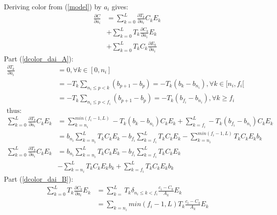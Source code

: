 \documentclass{article}
\begin{document}
\begin{appendices}
    Deriving color from (\ref{model}) by $a_i$ gives:
    \begin{align}
        \frac{\partial C}{\partial a_i} & = \sum_{k=0}^{L} \frac{\partial T_k}{\partial a_i} C_k E_k \label{dcolor_dai_A} \\
                                        & + \sum_{k=0}^{L} T_k \frac{\partial C_k}{\partial a_i} E_k \label{dcolor_dai_B} \\
                                        & + \sum_{k=0}^{L} T_k C_k \frac{\partial E_k}{\partial a_i} \label{dcolor_dai_C}
    \end{align}
    Part (\ref{dcolor_dai_A}):
    \begin{align}
        \frac{\partial T_k}{\partial a_i} & = 0, \forall k \in [0,n_i] \nonumber \\
                                          & = -T_k \sum_{n_i \leq p < k} (b_{p+1} - b_p) = -T_k (b_k - b_{n_i}), \forall k \in [n_i, f_i[ \nonumber \\
                                          & = -T_k \sum_{n_i \leq p < f_i}(b_{p+1} - b_p) = -T_k (b_{f_i} - b_{n_i}), \forall k \geq f_i \nonumber \\
        \text{thus:} \nonumber \\
        \sum_{k=0}^{L} \frac{\partial T_k}{\partial a_i} C_k E_k & = \sum_{k=n_i}^{min(f_i-1,L)} -T_k (b_k - b_{n_i}) C_k E_k + \sum_{k=f_i}^{L} -T_k (b_{f_i} - b_{n_i}) C_k E_k \nonumber \\
                                                                 & = b_{n_i} \sum_{k=n_i}^{L} T_k C_k E_k - b_{f_i} \sum_{k = f_i}^{L} T_k C_k E_k - \sum_{k=n_i}^{min(f_i-1,L)} T_k C_k E_k b_k \nonumber \\
        \sum_{k=0}^{L} \frac{\partial T_k}{\partial a_i} C_k E_k & = b_{n_i} \sum_{k=n_i}^{L} T_k C_k E_k - b_{f_i} \sum_{k = f_i}^{L} T_k C_k E_k \nonumber \\
                                                                 & - \sum_{k=n_i}^{L} T_k C_k E_k b_k + \sum_{k=f_i}^{L} T_k C_k E_k b_k \nonumber
    \end{align}
    Part (\ref{dcolor_dai_B}):
    \begin{align}
        \sum_{k=0}^{L} T_k \frac{\partial C_k}{\partial a_i} E_k & = \sum_{k=}^{L} T_k \delta_{n_i \leq k < f_i} \frac{c_i-C_k}{A_k} E_k \nonumber \\
                                                                 & = \sum_{k=n_i}{min(f_i-1,L)} T_k \frac{c_i-C_k}{A_k} E_k \nonumber \\

\end{align}
\end{appendices}
\end{document}
